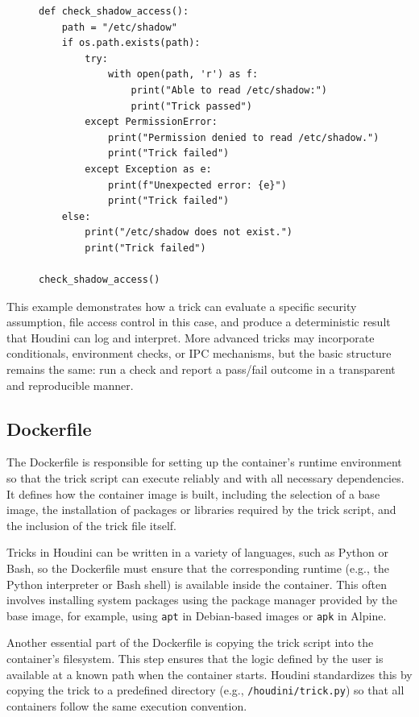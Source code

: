 \documentclass[12pt]{report}
\begin{document}
\begin{doublespace}
\begin{figure}[H]
\begin{lstlisting}
def check_shadow_access():
    path = "/etc/shadow"
    if os.path.exists(path):
        try:
            with open(path, 'r') as f:
                print("Able to read /etc/shadow:")
                print("Trick passed")
        except PermissionError:
            print("Permission denied to read /etc/shadow.")
            print("Trick failed")
        except Exception as e:
            print(f"Unexpected error: {e}")
            print("Trick failed")
    else:
        print("/etc/shadow does not exist.")
        print("Trick failed")

check_shadow_access()
\end{lstlisting}
\end{figure}


This example demonstrates how a trick can evaluate a specific security assumption, file access control in this case, and produce a deterministic result that Houdini can log and interpret. More advanced tricks may incorporate conditionals, environment checks, or IPC mechanisms, but the basic structure remains the same: run a check and report a pass/fail outcome in a transparent and reproducible manner.



\subsection{Dockerfile}

The Dockerfile is responsible for setting up the container's runtime environment so that the trick script can execute reliably and with all necessary dependencies. It defines how the container image is built, including the selection of a base image, the installation of packages or libraries required by the trick script, and the inclusion of the trick file itself.

Tricks in Houdini can be written in a variety of languages, such as Python or Bash, so the Dockerfile must ensure that the corresponding runtime (e.g., the Python interpreter or Bash shell) is available inside the container. This often involves installing system packages using the package manager provided by the base image, for example, using \texttt{apt} in Debian-based images or \texttt{apk} in Alpine.

Another essential part of the Dockerfile is copying the trick script into the container's filesystem. This step ensures that the logic defined by the user is available at a known path when the container starts. Houdini standardizes this by copying the trick to a predefined directory (e.g., \texttt{/houdini/trick.py}) so that all containers follow the same execution convention.


\end{doublespace}
\end{document}

